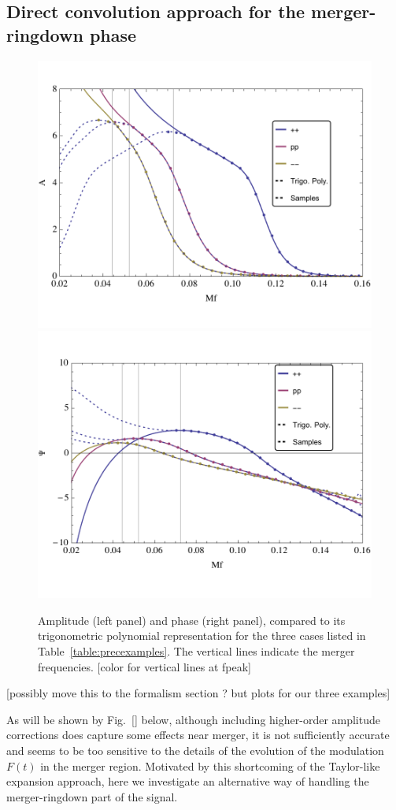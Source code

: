 \documentclass[aps,showpacs,twocolumn,
prd,superscriptaddress,nofootinbib]{revtex4-1}
\newcommand{\SM}[1]{{\color{Red} #1}}
\begin{document}

\subsection{Direct convolution approach for the merger-ringdown phase}
\label{subsec:convolution}

\begin{figure}
  \centering
  \includegraphics[width=.48\linewidth]{plots/trig_amp.pdf}
  \hspace{0.2cm}
  \includegraphics[width=.48\linewidth]{plots/trig_phase.pdf}
  \caption{Amplitude (left panel) and phase (right panel), compared to its trigonometric polynomial representation for the three cases listed in Table~\ref{table:precexamples}. The vertical lines indicate the merger frequencies. \SM{[color for vertical lines at fpeak]}}
  \label{fig:trigopoly}
\end{figure}

\SM{[possibly move this to the formalism section ? but plots for our three examples]}

As will be shown by Fig.~\ref{} below, although including higher-order amplitude corrections does capture some effects near merger, it is not sufficiently accurate and seems to be too sensitive to the details of the evolution of the modulation $F(t)$ in the merger region. Motivated by this shortcoming of the Taylor-like expansion approach, here we investigate an alternative way of handling the merger-ringdown part of the signal.
\end{document}
